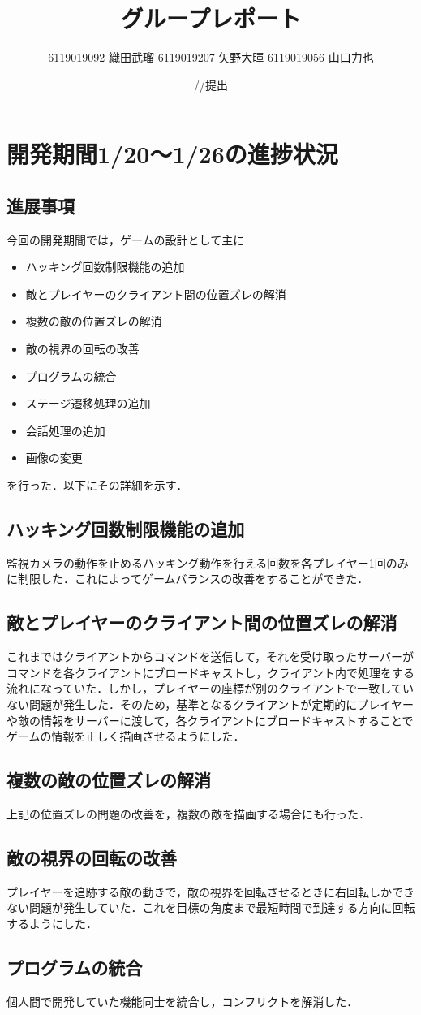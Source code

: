 \documentclass{jarticle}
\title{グループレポート}
\author{6119019092 織田武瑠 6119019207 矢野大暉 6119019056 山口力也}
\date{\number\year/\number\month/\number\day 提出}
\newcommand{\xa}{ハッキング回数制限機能の追加}
\newcommand{\xb}{敵とプレイヤーのクライアント間の位置ズレの解消}
\newcommand{\xc}{複数の敵の位置ズレの解消}
\newcommand{\xd}{敵の視界の回転の改善}
\newcommand{\xe}{プログラムの統合}
\newcommand{\xf}{ステージ遷移処理の追加}
\newcommand{\xg}{会話処理の追加}
\newcommand{\xh}{画像の変更}
\newcommand{\pitem}[8]{
\item #1
\item #2
\item #3
\item #4
\item #5
\item #6
\item #7
\item #8
}
\begin{document}
\maketitle

\section{開発期間1/20～1/26の進捗状況} 

\subsection{進展事項}
今回の開発期間では，ゲームの設計として主に
\begin{itemize}
\pitem{\xa}{\xb}{\xc}{\xd}{\xe}{\xf}{\xg}{\xh}
\end{itemize}
を行った．以下にその詳細を示す．

\subsection{\xa}
監視カメラの動作を止めるハッキング動作を行える回数を各プレイヤー1回のみに制限した．これによってゲームバランスの改善をすることができた．

\subsection{\xb}
これまではクライアントからコマンドを送信して，それを受け取ったサーバーがコマンドを各クライアントにブロードキャストし，クライアント内で処理をする流れになっていた．しかし，プレイヤーの座標が別のクライアントで一致していない問題が発生した．そのため，基準となるクライアントが定期的にプレイヤーや敵の情報をサーバーに渡して，各クライアントにブロードキャストすることでゲームの情報を正しく描画させるようにした．

\subsection{\xc}
上記の位置ズレの問題の改善を，複数の敵を描画する場合にも行った．

\subsection{\xd}
プレイヤーを追跡する敵の動きで，敵の視界を回転させるときに右回転しかできない問題が発生していた．これを目標の角度まで最短時間で到達する方向に回転するようにした．

\subsection{\xe}
個人間で開発していた機能同士を統合し，コンフリクトを解消した．
\end{document}
